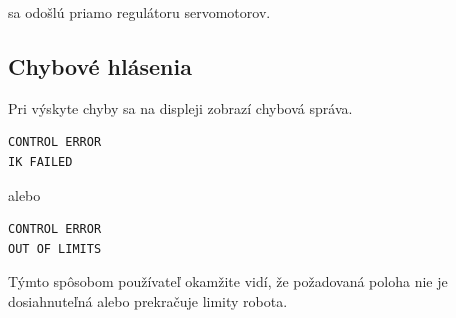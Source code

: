 sa odošlú priamo regulátoru servomotorov.

\subsection{Chybové hlásenia}

Pri výskyte chyby sa na displeji zobrazí chybová správa.

\begin{lstlisting}[caption={Ukážka chyby}]
CONTROL ERROR
IK FAILED
\end{lstlisting}

alebo

\begin{lstlisting}[caption={Ukážka chyby}]
CONTROL ERROR
OUT OF LIMITS
\end{lstlisting}

Týmto spôsobom používateľ okamžite vidí, že požadovaná poloha nie je dosiahnuteľná alebo prekračuje limity robota.